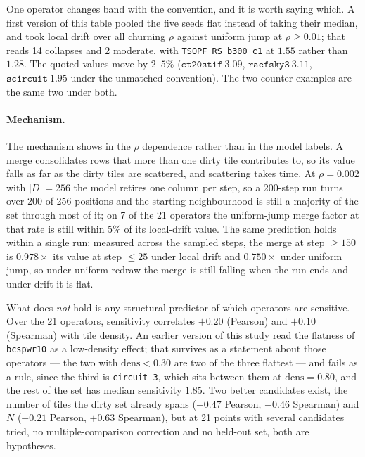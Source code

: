 \documentclass{article}
\begin{document}
One operator changes band with the convention, and it is worth saying which. A
first version of this table pooled the five seeds flat instead of taking their
median, and took local drift over all churning $\rho$ against uniform jump at
$\rho \geq 0.01$; that reads 14 collapses and 2 moderate, with
\texttt{TSOPF\_RS\_b300\_c1} at $1.55$ rather than $1.28$. The quoted values move
by $2$--$5\%$ ($\texttt{ct20stif}\ 3.09$, $\texttt{raefsky3}\ 3.11$,
$\texttt{scircuit}\ 1.95$ under the unmatched convention). The two
counter-examples are the same two under both.

\paragraph{Mechanism.}
The mechanism shows in the $\rho$ dependence rather than in the model labels. A
merge consolidates rows that more than one dirty tile contributes to, so its
value falls as far as the dirty tiles are scattered, and scattering takes time.
At $\rho{=}0.002$ with $|D|{=}256$ the model retires one column per step, so a
200-step run turns over 200 of 256 positions and the starting neighbourhood is
still a majority of the set through most of it; on 7 of the 21 operators the
uniform-jump merge factor at that rate is still within $5\%$ of its local-drift
value. The
same prediction holds within a single run: measured across the sampled steps,
the merge at step $\geq 150$ is $0.978\times$ its value at step $\leq 25$ under
local drift and $0.750\times$ under uniform jump, so under uniform redraw the
merge is still falling when the run ends and under drift it is flat.

What does \emph{not} hold is any structural predictor of which operators are
sensitive. Over the 21 operators, sensitivity correlates $+0.20$ (Pearson) and
$+0.10$ (Spearman) with tile density. An earlier version of this study read the
flatness of \texttt{bcspwr10} as a low-density effect; that survives as a
statement about those operators --- the two with $\mathrm{dens} < 0.30$ are two
of the three flattest --- and fails as a rule, since the third is
\texttt{circuit\_3}, which sits between them at $\mathrm{dens} = 0.80$, and the
rest of the set has median sensitivity $1.85$. Two better candidates exist, the
number of tiles the dirty set already spans ($-0.47$ Pearson, $-0.46$ Spearman)
and $N$ ($+0.21$ Pearson, $+0.63$ Spearman), but at
21 points with several candidates tried, no multiple-comparison correction and
no held-out set, both are hypotheses.
\end{document}
